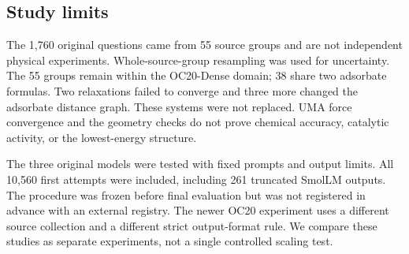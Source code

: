 \subsection{Study limits}

The 1,760 original questions came from 55 source groups and are not independent physical experiments. Whole-source-group resampling was used for uncertainty. The 55 groups remain within the OC20-Dense domain; 38 share two adsorbate formulas. Two relaxations failed to converge and three more changed the adsorbate distance graph. These systems were not replaced. UMA force convergence and the geometry checks do not prove chemical accuracy, catalytic activity, or the lowest-energy structure.\cite{chanussot2021open,wood2025uma}

The three original models were tested with fixed prompts and output limits. All 10,560 first attempts were included, including 261 truncated SmolLM outputs. The procedure was frozen before final evaluation but was not registered in advance with an external registry. The newer OC20 experiment uses a different source collection and a different strict output-format rule. We compare these studies as separate experiments, not a single controlled scaling test.
